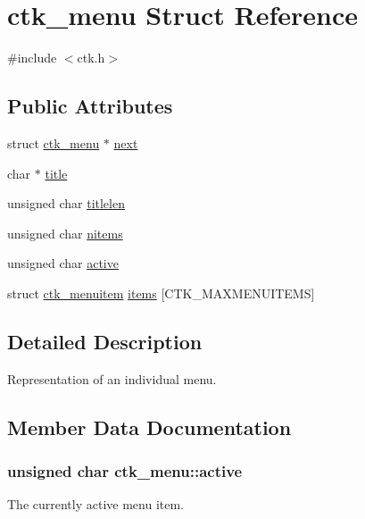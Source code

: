\hypertarget{structctk__menu}{}\section{ctk\+\_\+menu Struct Reference}
\label{structctk__menu}


{\ttfamily \#include $<$ctk.\+h$>$}

\subsection*{Public Attributes}
\begin{DoxyCompactItemize}
\item 
struct \hyperlink{structctk__menu}{ctk\+\_\+menu} $\ast$ \hyperlink{structctk__menu_a3db782ac147f877ad858f963ce3a3f31}{next}
\item 
char $\ast$ \hyperlink{structctk__menu_ad615e76a042ea15b52b7f30edc4d4c89}{title}
\item 
unsigned char \hyperlink{structctk__menu_afe750b5bc481a67c6e7f684dbaa7bfd8}{titlelen}
\item 
unsigned char \hyperlink{structctk__menu_a1929cc70bb8d66ead25d37828d68bfc2}{nitems}
\item 
unsigned char \hyperlink{structctk__menu_a4a97e6108145907fe4b83fd8f5862df5}{active}
\item 
struct \hyperlink{structctk__menuitem}{ctk\+\_\+menuitem} \hyperlink{structctk__menu_a5e3c53417a3e30ca1a51dfcfb0929d1f}{items} \mbox{[}C\+T\+K\+\_\+\+M\+A\+X\+M\+E\+N\+U\+I\+T\+E\+M\+S\mbox{]}
\end{DoxyCompactItemize}


\subsection{Detailed Description}
Representation of an individual menu. 

\subsection{Member Data Documentation}
\hypertarget{structctk__menu_a4a97e6108145907fe4b83fd8f5862df5}{}
\subsubsection[{active}]{\setlength{\rightskip}{0pt plus 5cm}unsigned char ctk\+\_\+menu\+::active}\label{structctk__menu_a4a97e6108145907fe4b83fd8f5862df5}
The currently active menu item. \hypertarget{structctk__menu_a5e3c53417a3e30ca1a51dfcfb0929d1f}{}
